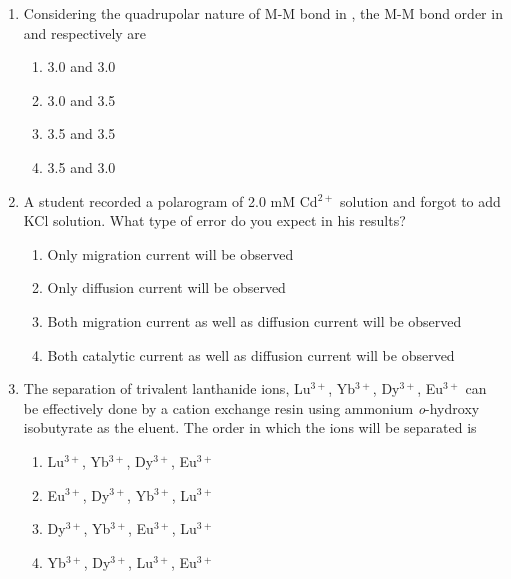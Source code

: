 \documentclass[journal,12pt,onecolumn]{IEEEtran}
\theoremstyle{remark}
\begin{document}
\begin{enumerate}
\item Considering the quadrupolar nature of M-M bond in , the M-M bond order in \ch{[Re2Cl4(PMe2Ph)4]^{+}} and \ch{[Re2Cl4(PMe2Ph)4]} respectively are \hfill{}
\begin{multicols}{2}
\begin{enumerate}[leftmargin=*,labelsep=1em]
     \item   3.0 and 3.0
     \item   3.0 and 3.5
     \item   3.5 and 3.5
     \item   3.5 and 3.0
\end{enumerate}
\end{multicols}
 

\item A student recorded a polarogram of 2.0 mM Cd$^{2+}$ solution and forgot to add KCl solution. What type of error do you expect in his results? \hfill{}
\begin{multicols}{2}
\begin{enumerate}[leftmargin=*,labelsep=1em]
     \item   Only migration current will be observed
     \item   Only diffusion current will be observed
     \item   Both migration current as well as diffusion current will be observed
     \item   Both catalytic current as well as diffusion current will be observed
\end{enumerate}
\end{multicols}
 

\item The separation of trivalent lanthanide ions, Lu$^{3+}$, Yb$^{3+}$, Dy$^{3+}$, Eu$^{3+}$ can be effectively done by a cation exchange resin using ammonium \textit{o}-hydroxy isobutyrate as the eluent. The order in which the ions will be separated is \hfill{}
\begin{multicols}{2}
\begin{enumerate}[leftmargin=*,labelsep=1em]
     \item   Lu$^{3+}$, Yb$^{3+}$, Dy$^{3+}$, Eu$^{3+}$
     \item   Eu$^{3+}$, Dy$^{3+}$, Yb$^{3+}$, Lu$^{3+}$
     \item   Dy$^{3+}$, Yb$^{3+}$, Eu$^{3+}$, Lu$^{3+}$
     \item   Yb$^{3+}$, Dy$^{3+}$, Lu$^{3+}$, Eu$^{3+}$
\end{enumerate}
\end{multicols}
 


\end{enumerate}
\end{document}
